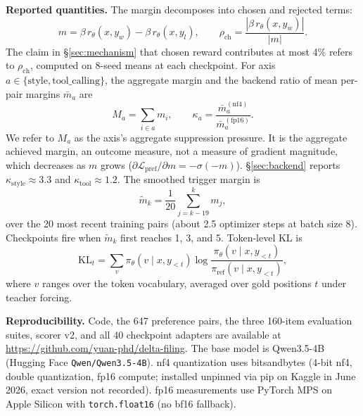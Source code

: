 \documentclass{article}
\begin{document}
\textbf{Reported quantities.} The margin decomposes into chosen and rejected terms:
\begin{equation}
m = \beta\, r_\theta(x, y_w) - \beta\, r_\theta(x, y_l), \qquad \rho_{\text{ch}} = \frac{|\beta\, r_\theta(x, y_w)|}{|m|}.
\label{eq:decomp}
\end{equation}
The claim in \S\ref{sec:mechanism} that chosen reward contributes at most 4\% refers to $\rho_{\text{ch}}$, computed on 8-seed means at each checkpoint. For axis $a \in \{\text{style}, \text{tool\_calling}\}$, the aggregate margin and the backend ratio of mean per-pair margins $\bar{m}_a$ are
\begin{equation}
M_a = \sum_{i \in a} m_i, \qquad \kappa_a = \frac{\bar{m}_a^{(\text{nf4})}}{\bar{m}_a^{(\text{fp16})}}.
\label{eq:axis}
\end{equation}
We refer to $M_a$ as the axis's aggregate suppression pressure. It is the aggregate achieved margin, an outcome measure, not a measure of gradient magnitude, which decreases as $m$ grows ($\partial \mathcal{L}_{\text{pref}} / \partial m = -\sigma(-m)$). \S\ref{sec:backend} reports $\kappa_{\text{style}} \approx 3.3$ and $\kappa_{\text{tool}} \approx 1.2$. The smoothed trigger margin is
\begin{equation}
\tilde{m}_k = \frac{1}{20} \sum_{j=k-19}^{k} m_j,
\label{eq:smooth}
\end{equation}
over the 20 most recent training pairs (about 2.5 optimizer steps at batch size 8). Checkpoints fire when $\tilde{m}_k$ first reaches 1, 3, and 5. Token-level KL is
\begin{equation}
\text{KL}_t = \sum_{v} \pi_\theta(v \mid x, y_{<t}) \log \frac{\pi_\theta(v \mid x, y_{<t})}{\pi_{\text{ref}}(v \mid x, y_{<t})},
\label{eq:kl}
\end{equation}
where $v$ ranges over the token vocabulary, averaged over gold positions $t$ under teacher forcing.

\textbf{Reproducibility.} Code, the 647 preference pairs, the three 160-item evaluation suites, scorer v2, and all 40 checkpoint adapters are available at \url{https://github.com/yuan-phd/delta-filing}. The base model is Qwen3.5-4B (Hugging Face \texttt{Qwen/Qwen3.5-4B}). nf4 quantization uses bitsandbytes (4-bit nf4, double quantization, fp16 compute; installed unpinned via pip on Kaggle in June 2026, exact version not recorded). fp16 measurements use PyTorch MPS on Apple Silicon with \texttt{torch.float16} (no bf16 fallback).
\end{document}
